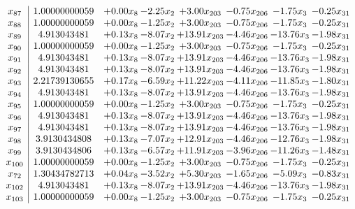\documentclass[8pt]{article}
\begin{document}
\[\begin{array}{c| c c@{\hskip 2pt} c@{\hskip 2pt} c@{\hskip 2pt} c@{\hskip 2pt} c@{\hskip 2pt} c@{\hskip 2pt} }
 x_{87}   &  1.00000000059 & +  0.00 x_{8} & -2.25 x_{2} & +  3.00 x_{203} & -0.75 x_{206} & -1.75 x_{3} & -0.25 x_{31}\\
 x_{88}   &  1.00000000059 & +  0.00 x_{8} & -1.25 x_{2} & +  3.00 x_{203} & -0.75 x_{206} & -1.75 x_{3} & -0.25 x_{31}\\
 x_{89}   &  4.913043481 & +  0.13 x_{8} & -8.07 x_{2} & + 13.91 x_{203} & -4.46 x_{206} & -13.76 x_{3} & -1.98 x_{31}\\
 x_{90}   &  1.00000000059 & +  0.00 x_{8} & -1.25 x_{2} & +  3.00 x_{203} & -0.75 x_{206} & -1.75 x_{3} & -0.25 x_{31}\\
 x_{91}   &  4.913043481 & +  0.13 x_{8} & -8.07 x_{2} & + 13.91 x_{203} & -4.46 x_{206} & -13.76 x_{3} & -1.98 x_{31}\\
 x_{92}   &  4.913043481 & +  0.13 x_{8} & -8.07 x_{2} & + 13.91 x_{203} & -4.46 x_{206} & -13.76 x_{3} & -1.98 x_{31}\\
 x_{93}   &  2.21739130655 & +  0.17 x_{8} & -6.59 x_{2} & + 11.22 x_{203} & -4.11 x_{206} & -11.85 x_{3} & -1.80 x_{31}\\
 x_{94}   &  4.913043481 & +  0.13 x_{8} & -8.07 x_{2} & + 13.91 x_{203} & -4.46 x_{206} & -13.76 x_{3} & -1.98 x_{31}\\
 x_{95}   &  1.00000000059 & +  0.00 x_{8} & -1.25 x_{2} & +  3.00 x_{203} & -0.75 x_{206} & -1.75 x_{3} & -0.25 x_{31}\\
 x_{96}   &  4.913043481 & +  0.13 x_{8} & -8.07 x_{2} & + 13.91 x_{203} & -4.46 x_{206} & -13.76 x_{3} & -1.98 x_{31}\\
 x_{97}   &  4.913043481 & +  0.13 x_{8} & -8.07 x_{2} & + 13.91 x_{203} & -4.46 x_{206} & -13.76 x_{3} & -1.98 x_{31}\\
 x_{98}   &  3.9130434808 & +  0.13 x_{8} & -7.07 x_{2} & + 12.91 x_{203} & -4.46 x_{206} & -12.76 x_{3} & -1.98 x_{31}\\
 x_{99}   &  3.9130434806 & +  0.13 x_{8} & -6.57 x_{2} & + 11.91 x_{203} & -3.96 x_{206} & -11.26 x_{3} & -1.48 x_{31}\\
 x_{100}   &  1.00000000059 & +  0.00 x_{8} & -1.25 x_{2} & +  3.00 x_{203} & -0.75 x_{206} & -1.75 x_{3} & -0.25 x_{31}\\
 x_{72}   &  1.30434782713 & +  0.04 x_{8} & -3.52 x_{2} & +  5.30 x_{203} & -1.65 x_{206} & -5.09 x_{3} & -0.83 x_{31}\\
 x_{102}   &  4.913043481 & +  0.13 x_{8} & -8.07 x_{2} & + 13.91 x_{203} & -4.46 x_{206} & -13.76 x_{3} & -1.98 x_{31}\\
 x_{103}   &  1.00000000059 & +  0.00 x_{8} & -1.25 x_{2} & +  3.00 x_{203} & -0.75 x_{206} & -1.75 x_{3} & -0.25 x_{31}\\

\end{array}\]
\end{document}
